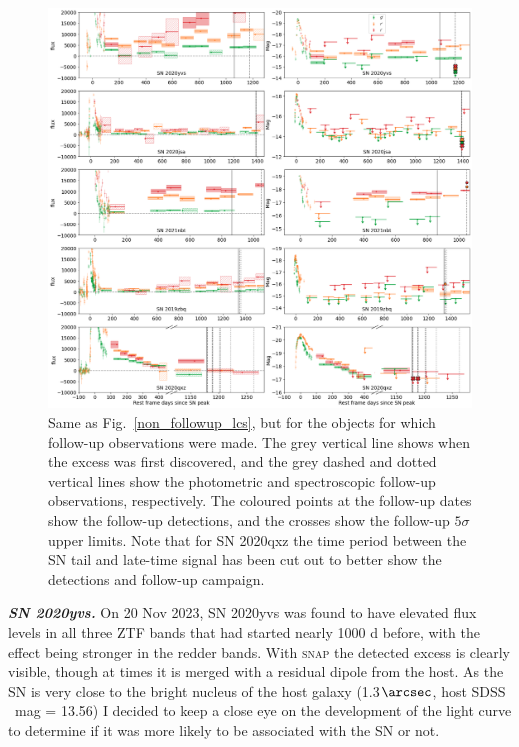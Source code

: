 \documentclass[a4paper,oneside,12pt, class=Latex/Classes/PhDthesisPSnPDF, crop=false]{standalone}
\begin{document}
\begin{figure}
    \centering
    \includegraphics[width=\textwidth]{../Images/chapter_5/followup_lcs.png}
    \caption{Same as Fig.~\ref{non_followup_lcs}, but for the objects for which follow-up observations were made. The grey vertical line shows when the excess was first discovered, and the grey dashed and dotted vertical lines show the photometric and spectroscopic follow-up observations, respectively. The coloured points at the follow-up dates show the follow-up detections, and the crosses show the follow-up $5\sigma$ upper limits. Note that for SN 2020qxz the time period between the SN tail and late-time signal has been cut out to better show the detections and follow-up campaign.}
    \label{followup_lcs}
\end{figure}


\textit{\textbf{SN 2020yvs.}}
On 20 Nov 2023, SN 2020yvs was found to have elevated flux levels in all three ZTF bands that had started nearly 1000 d before, with the effect being stronger in the redder bands. With \textsc{snap} the detected excess is clearly visible, though at times it is merged with a residual dipole from the host. As the SN is very close to the bright nucleus of the host galaxy (1.3$\arcsec$, host SDSS \ztfr\ mag = 13.56) I decided to keep a close eye on the development of the light curve to determine if it was more likely to be associated with the SN or not.
\end{document}
